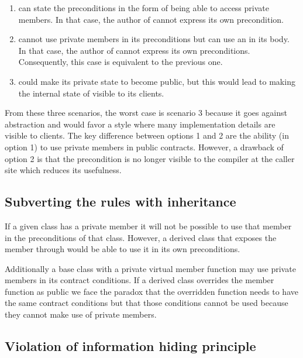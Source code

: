 \begin{enumerate}

\item {} can state the preconditions in the form of
\cppid{[[}\cppid{]]} being able to access private members. In
that case, the author of  cannot express its own
precondition.

\item {} cannot use private members in its
\cppid{[[}\cppid{]]} preconditions but can use an
\cppid{}\cppid{]]} in its body. In that case, the author of
 cannot express its own preconditions. Consequently,
this case is equivalent to the previous one.

\item {} could make its private state to become public, but this would
lead to making the internal state of  visible to its clients.

\end{enumerate}

From these three scenarios, the worst case is scenario 3 because it goes against
abstraction and would favor a style where many implementation details are
visible to clients. The key difference between options 1 and 2 are the ability
(in option 1) to use private members in public contracts. However, a drawback of
option 2 is that the precondition is no longer visible to the compiler at the
caller site which reduces its usefulness.

\subsection{Subverting the rules with inheritance}

If a given class has a private member it will not be possible to use that member
in the preconditions of that class. However, a derived class that exposes the
member through  would be able to use it in its own preconditions.

Additionally a base class with a private virtual member function may use private
members in its contract conditions. If a derived class overrides the member
function as public we face the paradox that the overridden function needs to have
the same contract conditions but that those conditions cannot be used because
they cannot make use of private members.

\subsection{Violation of information hiding principle}

